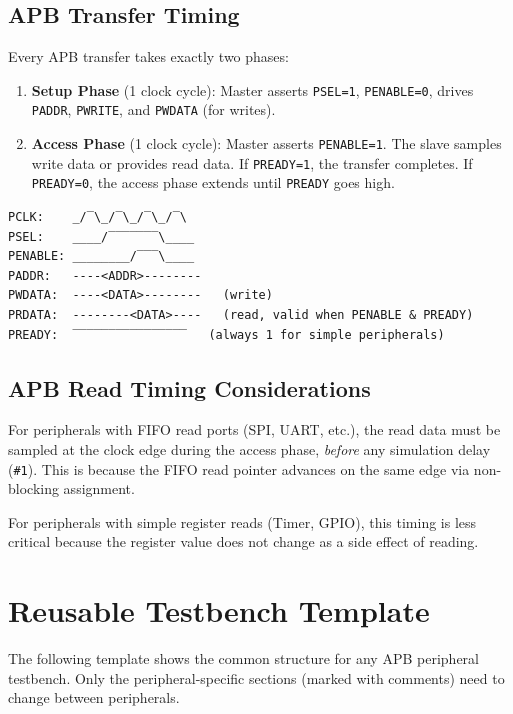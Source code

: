 \subsection{APB Transfer Timing}

Every APB transfer takes exactly two phases:

\begin{enumerate}[leftmargin=2em]
  \item \textbf{Setup Phase} (1 clock cycle): Master asserts \texttt{PSEL=1}, \texttt{PENABLE=0},
        drives \texttt{PADDR}, \texttt{PWRITE}, and \texttt{PWDATA} (for writes).
  \item \textbf{Access Phase} (1 clock cycle): Master asserts \texttt{PENABLE=1}. The slave
        samples write data or provides read data. If \texttt{PREADY=1}, the transfer completes.
        If \texttt{PREADY=0}, the access phase extends until \texttt{PREADY} goes high.
\end{enumerate}

\begin{verbatim}
PCLK:    _/‾\_/‾\_/‾\_/‾\
PSEL:    ____/‾‾‾‾‾‾‾\____
PENABLE: ________/‾‾‾\____
PADDR:   ----<ADDR>--------
PWDATA:  ----<DATA>--------   (write)
PRDATA:  --------<DATA>----   (read, valid when PENABLE & PREADY)
PREADY:  ‾‾‾‾‾‾‾‾‾‾‾‾‾‾‾‾   (always 1 for simple peripherals)
\end{verbatim}

\subsection{APB Read Timing Considerations}

For peripherals with FIFO read ports (SPI, UART, etc.), the read data must be sampled at the
clock edge during the access phase, \emph{before} any simulation delay (\texttt{\#1}). This is
because the FIFO read pointer advances on the same edge via non-blocking assignment.

For peripherals with simple register reads (Timer, GPIO), this timing is less critical because
the register value does not change as a side effect of reading.

\section{Reusable Testbench Template}

The following template shows the common structure for any APB peripheral testbench. Only the
peripheral-specific sections (marked with comments) need to change between peripherals.

